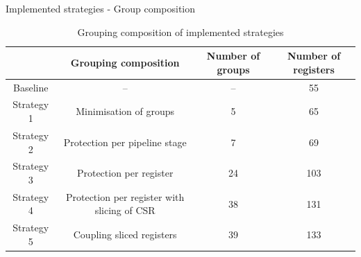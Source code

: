 \begin{frame}{Implemented strategies - Group composition}
    \begin{table}[t]
        \centering
        \caption{Grouping composition of implemented strategies}
        \label{tab:strategies_group}
        \begin{tabular}{@{}cccc@{}}
            \toprule
                       & Grouping composition                                 & Number of groups & Number of registers \\ \midrule
            Baseline   & --                                                   & --               & 55                  \\
            Strategy 1 & Minimisation of groups                               & 5                & 65                  \\
            Strategy 2 & Protection per pipeline stage                        & 7                & 69                  \\
            Strategy 3 & Protection per register                              & 24               & 103                 \\
            Strategy 4 & Protection per register with slicing of CSR & 38               & 131                 \\
            Strategy 5 & Coupling sliced registers                            & 39               & 133                 \\
            \bottomrule
        \end{tabular}
    \end{table}
\end{frame}
